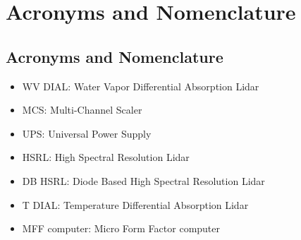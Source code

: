 
\chapter{Acronyms and Nomenclature}
\label{CH-Acronyms}

\section{Acronyms and Nomenclature}

\begin{itemize}
\item{WV DIAL: Water Vapor Differential Absorption Lidar}
\item{MCS: Multi-Channel Scaler}
\item{UPS: Universal Power Supply}
\item{HSRL: High Spectral Resolution Lidar}
\item{DB HSRL: Diode Based High Spectral Resolution Lidar}
\item{T DIAL: Temperature Differential Absorption Lidar}
\item{MFF computer: Micro Form Factor computer}
\end{itemize}
\newpage    

